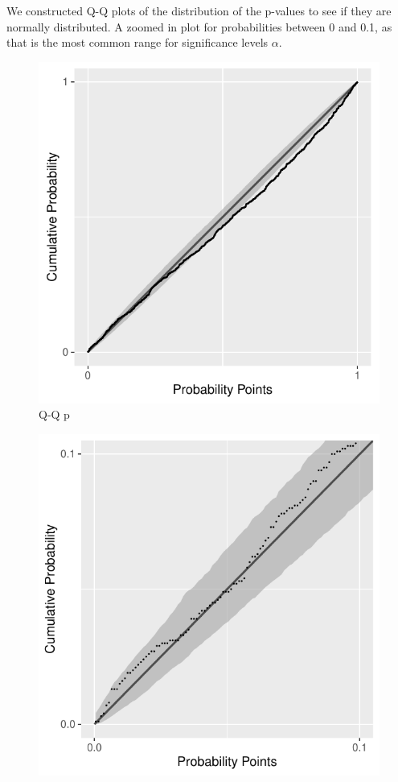 \documentclass[12pt, letterpaper]{article}
\begin{document}
We constructed Q-Q plots of the distribution of the p-values to see if they are
normally distributed. A zoomed in plot for probabilities between 0 and 0.1, as
that is the most common range for significance levels $\alpha$.

\begin{figure}[tbp]
  \centering
  \includegraphics[width=\textwidth]{figures/sim_800_normal_-0.4_0}
  \caption{Q-Q p}
  \label{fig:mu}
\end{figure}

\begin{figure}[tbp]
  \centering
  \includegraphics[width=\textwidth]{figures/zoom_800_normal_-0.4_0}
  \caption{}
  \label{fig:mu}
\end{figure}
\end{document}
